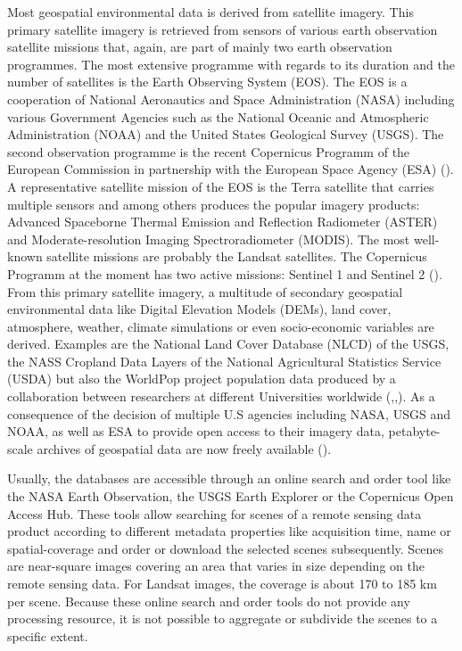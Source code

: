 Most geospatial environmental data is derived from satellite imagery. This primary satellite imagery is retrieved from sensors of various earth observation satellite missions that, again, are part of mainly two earth observation programmes. The most extensive programme with regards to its duration and the number of satellites is the Earth Observing System (EOS). The EOS is a cooperation of National Aeronautics and Space Administration (NASA) including various Government Agencies such as the National Oceanic and Atmospheric Administration (NOAA) and the United States Geological Survey (USGS). The second observation programme is the recent Copernicus Programm of the European Commission in partnership with the European Space Agency (ESA) (\cite{salomonson2002overview}). A representative satellite mission of the EOS is the Terra satellite that carries multiple sensors and among others produces the popular imagery products: Advanced Spaceborne Thermal Emission and Reflection Radiometer (ASTER) and Moderate-resolution Imaging Spectroradiometer (MODIS). The most well-known satellite missions are probably the Landsat satellites. The Copernicus Programm at the moment has two active missions: Sentinel 1 and Sentinel 2 (\cite{butler2014earth}).
From this primary satellite imagery, a multitude of secondary geospatial environmental data like Digital Elevation Models (DEMs), land cover, atmosphere, weather, climate simulations or even socio-economic variables are derived. Examples are the National Land Cover Database (NLCD) of the USGS, the NASS Cropland Data Layers of the National Agricultural Statistics Service (USDA) but also the WorldPop project population data produced by a collaboration between researchers at different Universities worldwide (\cite{homer2007completion},\cite{johnson20102009},\cite{tatem2017worldpop}). 
As a consequence of the decision of multiple U.S agencies including NASA, USGS and NOAA, as well as ESA to provide open access to their imagery data, petabyte-scale archives of geospatial data are now freely available (\cite{gorelick2017google}).

Usually, the databases are accessible through an online search and order tool like the NASA Earth Observation, the USGS Earth Explorer or the Copernicus Open Access Hub. These tools allow searching for scenes of a remote sensing data product according to different metadata properties like acquisition time, name or spatial-coverage and order or download the selected scenes subsequently. 
Scenes are near-square images covering an area that varies in size depending on the remote sensing data. For Landsat images, the coverage is about 170 to 185 km per scene. Because these online search and order tools do not provide any processing resource, it is not possible to aggregate or subdivide the scenes to a specific extent.

